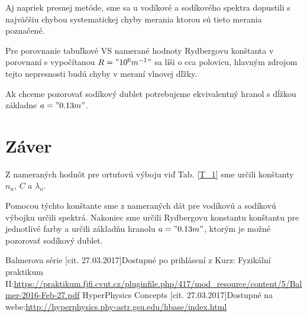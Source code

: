 \documentclass[10pt]{scrartcl}
\begin{document}
Aj napriek presnej metóde, sme sa u vodíkové a sodíkového spektra dopustili s najväčšiu chybou systematickej chyby merania ktorou sú tieto merania poznačené.

Pre porovnanie tabuľkové\cite{C_2} VS namerané hodnoty
Rydbergovu konštanta v porovnaní s vypočítanou $R="10^{6} m^{-1}"$ sa líši o cca polovicu, hlavným zdrojom tejto nepresnosti budú chyby v meraní vlnovej dľžky.

Ak chceme pozorovať sodíkový dublet potrebujeme ekvivalentný hranol s dĺžkou základne $a = "0.13 m"$.


\section{Záver}

Z nameraných hodnôt pre ortuťovú výboju viď Tab. \ref{T_1} sme určili konštanty $n_n$, $C$ a $\lambda_n$.

Pomocou týchto konštante sme z nameraných dát pre vodíkovú a sodíkovú výbojku určili spektrá.
Nakoniec sme určili Rydbergovu konstantu konštantu pre jednotlivé farby
a určili základňu hranolu $a = "0.13 m"$, ktorým je možné pozorovať sodíkový dublet.



\begin{thebibliography}{2}
Balmerova série [cit. 27.03.2017]Dostupné po prihlásení z Kurz: Fyzikální praktikum II:\url{https://praktikum.fjfi.cvut.cz/pluginfile.php/417/mod_resource/content/5/Balmer-2016-Feb-27.pdf}
HyperPhysics Concepts [cit. 27.03.2017]Dostupné na webe:\url{http://hyperphysics.phy-astr.gsu.edu/hbase/index.html}


\end{thebibliography}
\end{document}

